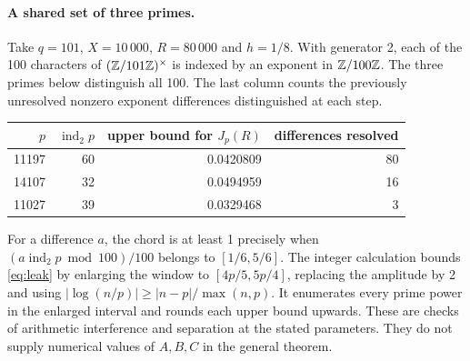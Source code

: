 \documentclass[11pt,letterpaper]{article}
\begin{document}
\paragraph{A shared set of three primes.}
Take $q=101$, $X=10\,000$, $R=80\,000$ and $h=1/8$. With generator 2, each of the 100 characters of $(\mathbb Z/101\mathbb Z)^\times$ is indexed by an exponent in $\mathbb Z/100\mathbb Z$. The three primes below distinguish all 100. The last column counts the previously unresolved nonzero exponent differences distinguished at each step.
\begin{center}
\begin{tabular}{rrrr}\toprule
$p$ & $\operatorname{ind}_2 p$ & upper bound for $J_p(R)$ & differences resolved\\\midrule
11197 & 60 & 0.0420809 & 80\\
14107 & 32 & 0.0494959 & 16\\
11027 & 39 & 0.0329468 & 3\\\bottomrule
\end{tabular}
\end{center}
For a difference $a$, the chord is at least 1 precisely when $(a\operatorname{ind}_2 p\bmod 100)/100$ belongs to $[1/6,5/6]$. The integer calculation bounds \eqref{eq:leak} by enlarging the window to $[4p/5,5p/4]$, replacing the amplitude by 2 and using $|\log(n/p)|\ge|n-p|/\max(n,p)$. It enumerates every prime power in the enlarged interval and rounds each upper bound upwards. These are checks of arithmetic interference and separation at the stated parameters. They do not supply numerical values of $A,B,C$ in the general theorem.
\end{document}
